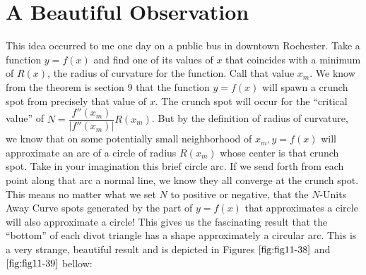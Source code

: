 \section{A Beautiful Observation}

This idea occurred to me one day on a public bus in downtown Rochester. Take a function $y = f(x)$ and find one of its values of $x$ that coincides with a minimum of $R(x)$, the radius of curvature for the function. Call that value $x_m$. We know from the theorem is section 9 that the function $y = f(x)$ will spawn a crunch spot from precisely that value of $x$. The crunch spot will occur for the ``critical value'' of $N = \dfrac{f''(x_m)}{|f''(x_m)|}R(x_m)$. But by the definition of radius of curvature, we know that on some potentially small neighborhood of $x_m, y = f(x)$ will approximate an arc of a circle of radius $R(x_m)$ whose center is that crunch spot. Take in your imagination this brief circle arc. If we send forth from each point along that arc a normal line, we know they all converge at the crunch spot. This means no matter what we set $N$ to positive or negative, that the $N$-Units Away Curve spots generated by the part of $y = f(x)$ that approximates a circle will also approximate a circle! This gives us the fascinating result that the ``bottom'' of each divot triangle has a shape approximately a circular arc. This is a very strange, beautiful result and is depicted in Figures $\ref{fig:fig11-38}$ and $\ref{fig:fig11-39}$ bellow:

